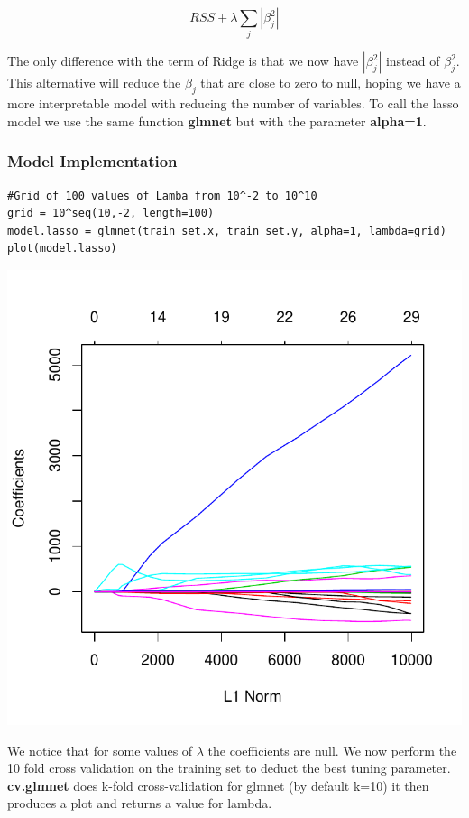 \documentclass[]{report}
\begin{document}
\begin{equation} \label{eq2}
RSS + \lambda \sum_{j}{|\beta_{j}^{2}|}
\end{equation}	

The only difference with the term of Ridge is that we now have $|\beta_{j}^{2}|$ instead of $\beta_{j}^{2}$. This alternative will reduce the $\beta_{j}$ that are close to zero to null, hoping we have a more interpretable model with reducing the number of variables. To call the lasso model we use the same function \textbf{glmnet} but with the parameter \textbf{alpha=1}.

\subsubsection{Model Implementation}
\begin{lstlisting}
#Grid of 100 values of Lamba from 10^-2 to 10^10
grid = 10^seq(10,-2, length=100)
model.lasso = glmnet(train_set.x, train_set.y, alpha=1, lambda=grid)
plot(model.lasso)
\end{lstlisting}

\begin{center}
	\includegraphics[width=0.8\linewidth]{Figures/lasso_model.pdf}
\end{center}

We notice that for some values of $\lambda$ the coefficients are null. We now perform the 10 fold cross validation on the training set to deduct the best tuning parameter. \textbf{cv.glmnet} does k-fold cross-validation for glmnet (by default k=10) it then  produces a plot and returns a value for lambda.
\end{document}

